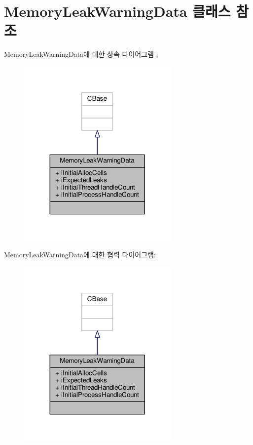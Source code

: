 \hypertarget{class_memory_leak_warning_data}{}\section{Memory\+Leak\+Warning\+Data 클래스 참조}
\label{class_memory_leak_warning_data}


Memory\+Leak\+Warning\+Data에 대한 상속 다이어그램 \+: 
\nopagebreak
\begin{figure}[H]
\begin{center}
\leavevmode
\includegraphics[width=224pt]{class_memory_leak_warning_data__inherit__graph}
\end{center}
\end{figure}


Memory\+Leak\+Warning\+Data에 대한 협력 다이어그램\+:
\nopagebreak
\begin{figure}[H]
\begin{center}
\leavevmode
\includegraphics[width=224pt]{class_memory_leak_warning_data__coll__graph}
\end{center}
\end{figure}
